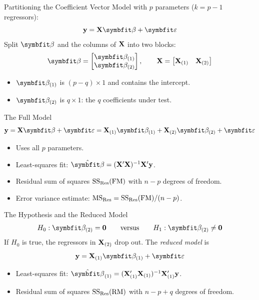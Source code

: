 \begin{frame}{Partitioning the Coefficient Vector}
    Model with $p$ parameters ($k=p-1$ regressors):
    \[
    \by = \bX\bbeta + \bvarepsilon
    \]
    Split $\bbeta$ and the columns of $\mathbf{X}$ into two blocks:
    \[
    \bbeta =
    \begin{bmatrix}
        \bbeta_{(1)} \\ \bbeta_{(2)}
    \end{bmatrix},
    \qquad
    \bX = \begin{bmatrix} \bX_{(1)} & \bX_{(2)} \end{bmatrix}
    \]
    \begin{itemize}
        \item $\bbeta_{(1)}$ is $(p-q)\times 1$ and contains the intercept.
        \item $\bbeta_{(2)}$ is $q\times 1$: the $q$ coefficients under test.
    \end{itemize}
\end{frame}


\begin{frame}{The Full Model}
    \[
    \by = \bX\bbeta + \bvarepsilon = \bX_{(1)}\bbeta_{(1)} + \bX_{(2)}\bbeta_{(2)} + \bvarepsilon
    \]
    \begin{itemize}
        \item Uses all $p$ parameters.
        \item Least-squares fit: $\hat{\bbeta} = (\bX'\bX)^{-1}\bX'\by$.
        \item Residual sum of squares $\mathrm{SS}_{\mathrm{Res}}(\mathrm{FM})$ with $n-p$ degrees of freedom.
        \item Error variance estimate: $\mathrm{MS}_{\mathrm{Res}} = \mathrm{SS}_{\mathrm{Res}}(\mathrm{FM})/(n-p)$.
    \end{itemize}
\end{frame}


\begin{frame}{The Hypothesis and the Reduced Model}
    \[
    H_0:\bbeta_{(2)}=\bzero
    \qquad\text{versus}\qquad
    H_1:\bbeta_{(2)}\neq\bzero
    \]
    If $H_0$ is true, the regressors in $\mathbf{X}_{(2)}$ drop out. The \emph{reduced model} is
    \[
    \by = \bX_{(1)}\bbeta_{(1)} + \bvarepsilon
    \]
    \begin{itemize}
        \item Least-squares fit: $\hat{\bbeta}_{(1)}=(\bX_{(1)}'\bX_{(1)})^{-1}\bX_{(1)}'\by$.
        \item Residual sum of squares $\mathrm{SS}_{\mathrm{Res}}(\mathrm{RM})$ with $n-p+q$ degrees of freedom.
    \end{itemize}
\end{frame}



